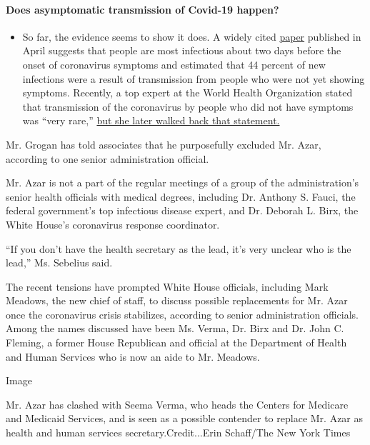 \begin{itemize}
{  \paragraph{Does asymptomatic transmission of Covid-19
  happen?}\label{does-asymptomatic-transmission-of-covid-19-happen}}

  \begin{itemize}
  \tightlist
  \item
    So far, the evidence seems to show it does. A widely cited
    \href{https://www.nature.com/articles/s41591-020-0869-5}{paper}
    published in April suggests that people are most infectious about
    two days before the onset of coronavirus symptoms and estimated that
    44 percent of new infections were a result of transmission from
    people who were not yet showing symptoms. Recently, a top expert at
    the World Health Organization stated that transmission of the
    coronavirus by people who did not have symptoms was ``very rare,''
    \href{https://www.nytimes.com/2020/06/09/world/coronavirus-updates.html?action=click\&pgtype=Article\&state=default\&region=MAIN_CONTENT_3\&context=storylines_faq\#link-1f302e21}{but
    she later walked back that statement.}
  \end{itemize}
\end{itemize}

Mr. Grogan has told associates that he purposefully excluded Mr. Azar,
according to one senior administration official.

Mr. Azar is not a part of the regular meetings of a group of the
administration's senior health officials with medical degrees, including
Dr. Anthony S. Fauci, the federal government's top infectious disease
expert, and Dr. Deborah L. Birx, the White House's coronavirus response
coordinator.

``If you don't have the health secretary as the lead, it's very unclear
who is the lead,'' Ms. Sebelius said.

The recent tensions have prompted White House officials, including Mark
Meadows, the new chief of staff, to discuss possible replacements for
Mr. Azar once the coronavirus crisis stabilizes, according to senior
administration officials. Among the names discussed have been Ms. Verma,
Dr. Birx and Dr. John C. Fleming, a former House Republican and official
at the Department of Health and Human Services who is now an aide to Mr.
Meadows.

Image

Mr. Azar has clashed with Seema Verma, who heads the Centers for
Medicare and Medicaid Services, and is seen as a possible contender to
replace Mr. Azar as health and human services secretary.Credit...Erin
Schaff/The New York Times

